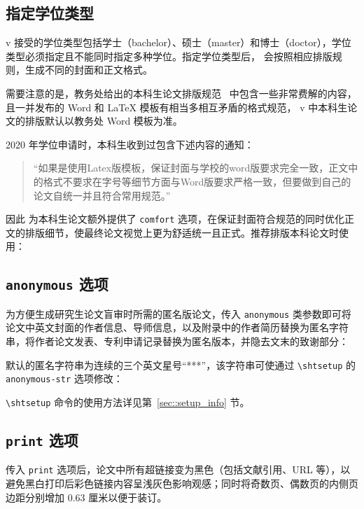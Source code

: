 \documentclass[master]{shtthesis}
\begin{document}
\subsection{指定学位类型}
\shtthesis{} v\version{} 接受的学位类型包括学士（bachelor）、硕士（master）和博士（doctor），学位类型必须指定且不能同时指定多种学位。指定学位类型后，\shtthesis{} 会按照相应排版规则，生成不同的封面和正文格式。

需要注意的是，教务处给出的本科生论文排版规范~\citep{bachelor2019} 中包含一些非常费解的内容，且一并发布的 Word 和 \LaTeX{} 模板有相当多相互矛盾的格式规范，\shtthesis{} v\version{} 中本科生论文的排版默认以教务处 Word 模板为准。

2020 年学位申请时，本科生收到过包含下述内容的通知：
\begin{quotation}
“如果是使用Latex版模板，保证封面与学校的word版要求完全一致，正文中的格式不要求在字号等细节方面与Word版要求严格一致，但要做到自己的论文自统一并且符合常用规范。”
\end{quotation}
因此 \shtthesis{} 为本科生论文额外提供了 \verb|comfort| 选项，在保证封面符合规范的同时优化正文的排版细节，使最终论文视觉上更为舒适统一且正式。推荐排版本科论文时使用：

\subsection{\texttt{anonymous} 选项} \label{sec::option_anonymous}
为方便生成研究生论文盲审时所需的匿名版论文，传入 \verb|anonymous| 类参数即可将论文中英文封面的作者信息、导师信息，以及附录中的作者简历替换为匿名字符串，将作者论文发表、专利申请记录替换为匿名版本，并隐去文末的致谢部分：
\shtthesis{} 默认的匿名字符串为连续的三个英文星号“***”，该字符串可使通过 \verb|\shtsetup| 的 \verb|anonymous-str| 选项修改：
\begin{latex}
\end{latex}
\verb|\shtsetup| 命令的使用方法详见第~\ref{sec::setup_info} 节。

\subsection{\texttt{print} 选项}
传入 \verb|print| 选项后，论文中所有超链接变为黑色（包括文献引用、URL 等），以避免黑白打印后彩色链接内容呈浅灰色影响观感；同时将奇数页、偶数页的内侧页边距分别增加 0.63 厘米以便于装订。
\end{document}
